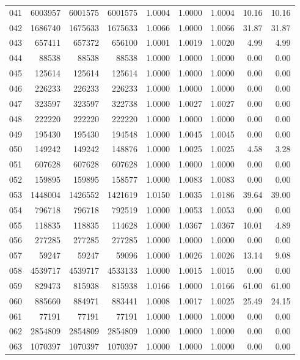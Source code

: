 \begin{longtable}{crrrrrrrr}
041 & 6003957 & 6001575 & 6001575 & 1.0004 & 1.0000 & 1.0004 & 10.16 & 10.16 \\
042 & 1686740 & 1675633 & 1675633 & 1.0066 & 1.0000 & 1.0066 & 31.87 & 31.87 \\
043 & 657411 & 657372 & 656100 & 1.0001 & 1.0019 & 1.0020 & 4.99 & 4.99 \\
044 & 88538 & 88538 & 88538 & 1.0000 & 1.0000 & 1.0000 & 0.00 & 0.00 \\
045 & 125614 & 125614 & 125614 & 1.0000 & 1.0000 & 1.0000 & 0.00 & 0.00 \\
046 & 226233 & 226233 & 226233 & 1.0000 & 1.0000 & 1.0000 & 0.00 & 0.00 \\
047 & 323597 & 323597 & 322738 & 1.0000 & 1.0027 & 1.0027 & 0.00 & 0.00 \\
048 & 222220 & 222220 & 222220 & 1.0000 & 1.0000 & 1.0000 & 0.00 & 0.00 \\
049 & 195430 & 195430 & 194548 & 1.0000 & 1.0045 & 1.0045 & 0.00 & 0.00 \\
050 & 149242 & 149242 & 148876 & 1.0000 & 1.0025 & 1.0025 & 4.58 & 3.28 \\
051 & 607628 & 607628 & 607628 & 1.0000 & 1.0000 & 1.0000 & 0.00 & 0.00 \\
052 & 159895 & 159895 & 158577 & 1.0000 & 1.0083 & 1.0083 & 0.00 & 0.00 \\
053 & 1448004 & 1426552 & 1421619 & 1.0150 & 1.0035 & 1.0186 & 39.64 & 39.00 \\
054 & 796718 & 796718 & 792519 & 1.0000 & 1.0053 & 1.0053 & 0.00 & 0.00 \\
055 & 118835 & 118835 & 114628 & 1.0000 & 1.0367 & 1.0367 & 10.01 & 4.89 \\
056 & 277285 & 277285 & 277285 & 1.0000 & 1.0000 & 1.0000 & 0.00 & 0.00 \\
057 & 59247 & 59247 & 59096 & 1.0000 & 1.0026 & 1.0026 & 13.14 & 9.08 \\
058 & 4539717 & 4539717 & 4533133 & 1.0000 & 1.0015 & 1.0015 & 0.00 & 0.00 \\
059 & 829473 & 815938 & 815938 & 1.0166 & 1.0000 & 1.0166 & 61.00 & 61.00 \\
060 & 885660 & 884971 & 883441 & 1.0008 & 1.0017 & 1.0025 & 25.49 & 24.15 \\
061 & 77191 & 77191 & 77191 & 1.0000 & 1.0000 & 1.0000 & 0.00 & 0.00 \\
062 & 2854809 & 2854809 & 2854809 & 1.0000 & 1.0000 & 1.0000 & 0.00 & 0.00 \\
063 & 1070397 & 1070397 & 1070397 & 1.0000 & 1.0000 & 1.0000 & 0.00 & 0.00 \\

\end{longtable}
